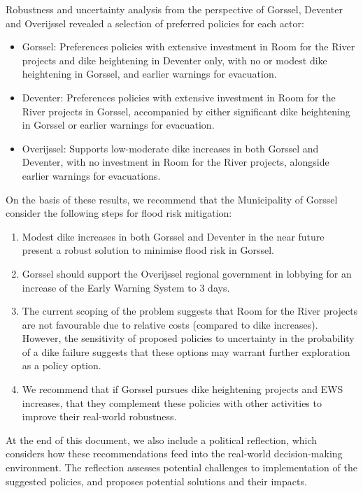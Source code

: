 \begin{multicols}{2}
\bigskip

Robustness and uncertainty analysis from the perspective of Gorssel, Deventer and Overijssel revealed a selection of preferred policies for each actor:
\begin{itemize}
    \item Gorssel: Preferences policies with extensive investment in Room for the River projects and dike heightening in Deventer only, with no or modest dike heightening in Gorssel, and earlier warnings for evacuation.
    \item Deventer: Preferences policies with extensive investment in Room for the River projects in Gorssel, accompanied by either significant dike heightening in Gorssel or earlier warnings for evacuation.
    \item Overijssel: Supports low-moderate dike increases in both Gorssel and Deventer, with no investment in Room for the River projects, alongside earlier warnings for evacuations.
\end{itemize}


On the basis of these results, we recommend that the Municipality of Gorssel consider the following steps for flood risk mitigation:
\begin{enumerate}
    \item Modest dike increases in both Gorssel and Deventer in the near future present a robust solution to minimise flood risk in Gorssel.
    \item Gorssel should support the Overijssel regional government in lobbying for an increase of the Early Warning System to 3 days.
    \item The current scoping of the problem suggests that Room for the River projects are not favourable due to relative costs (compared to dike increases). However, the sensitivity of proposed policies to uncertainty in the probability of a dike failure suggests that these options may warrant further exploration as a policy option.
    \item We recommend that if Gorssel pursues dike heightening projects and EWS increases, that they complement these policies with other activities to improve their real-world robustness.
\end{enumerate}

At the end of this document, we also include a political reflection, which considers how these recommendations feed into the real-world decision-making environment. The reflection assesses potential challenges to implementation of the suggested policies, and proposes potential solutions and their impacts.



\end{multicols}